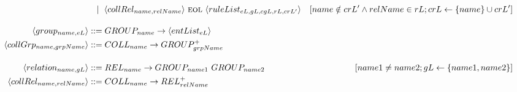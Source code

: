 \begin{landscape}
\begin{adjustbox}{max width=\linewidth,max height=.95\textheight,valign=c}
{\begin{align}
                                                            & ~~ \mid ~ \langle collRel_{name,relName} \rangle ~\textsc{eol}~ \langle ruleList_{eL,gL,cgL,rL,crL'} \rangle                                                                                                                                                                                                                                                                                 & [name \notin crL' \land relName \in rL; crL \gets \{name\} \cup crL']                                             \label{meta:ruleList:6} \\[1em]
                \langle group_{name, eL} \rangle            & ::= GROUP_{name} \to \langle entList_{eL} \rangle                                                                                                                                                                                                                                                                                                                     \label{meta:group}                                                                                                                                                 \\
                \langle collGrp_{name,grpName} \rangle      & ::= COLL_{name} \to GROUP_{grpName}^+                                                                                                                                                                                                                                                                                                                                 \label{meta:collGroup}                                                                                                                                             \\[1em]
                \langle relation_{name, gL} \rangle         & ::= REL_{name} \to GROUP_{name1} ~ GROUP_{name2}                                                                                                                                                                                                                                                                                                                                             & [name1 \neq name2; gL \gets \{name1, name2\}]                                                                     \label{meta:rel}        \\
                \langle collRel_{name,relName} \rangle      & ::= COLL_{name} \to REL_{relName}^+                                                                                                                                                                                                                                                                                                                                   \label{meta:collRel}                                                                                                                                               \\[1em]

\end{align}}
\end{adjustbox}
\end{landscape}

